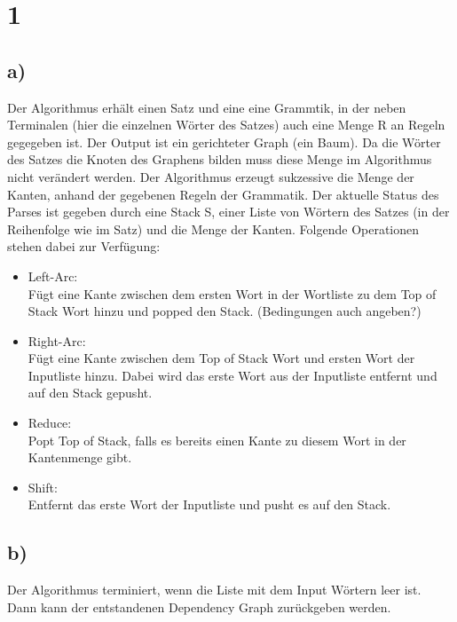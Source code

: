 \documentclass[a4paper,11pt,fleqn]{scrartcl}
\title{\titleinfo}
\author{\authorinfo}
\begin{document}
\maketitle
\notag

\section*{1}
\subsection*{a)}
Der Algorithmus erhält einen Satz und eine eine Grammtik, in der neben Terminalen (hier die einzelnen Wörter des Satzes) auch eine Menge R an Regeln gegegeben ist.
Der Output ist ein gerichteter Graph (ein Baum). 
Da die Wörter des Satzes die Knoten des Graphens bilden muss diese Menge im Algorithmus nicht verändert werden. 
Der Algorithmus erzeugt sukzessive die Menge der Kanten, anhand der gegebenen Regeln der Grammatik.
Der aktuelle Status des Parses ist gegeben durch eine Stack S, einer Liste von Wörtern des Satzes (in der Reihenfolge wie im Satz) und die Menge der Kanten.
Folgende Operationen stehen dabei zur Verfügung:
\begin{itemize}
 \item Left-Arc: \\ 
   Fügt eine Kante zwischen dem ersten Wort in der Wortliste zu dem Top of Stack Wort hinzu und popped den Stack. (Bedingungen auch angeben?)
 \item Right-Arc: \\
   Fügt eine Kante zwischen dem Top of Stack Wort und ersten Wort der Inputliste hinzu. 
   Dabei wird das erste Wort aus der Inputliste entfernt und auf den Stack gepusht.
 \item Reduce: \\
   Popt Top of Stack, falls es bereits einen Kante zu diesem Wort in der Kantenmenge gibt.  
 \item Shift: \\
   Entfernt das erste Wort der Inputliste und pusht es auf den Stack.
\end{itemize}
\subsection*{b)}
Der Algorithmus terminiert, wenn die Liste mit dem Input Wörtern leer ist. Dann kann der entstandenen Dependency Graph zurückgeben werden. 
\end{document}

